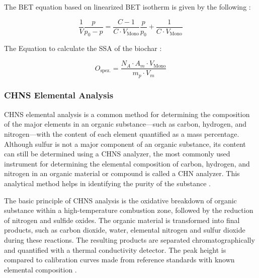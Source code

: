 \vspace{0.3em}

The BET equation based on linearized BET isotherm is given by the following \cite{UniBayreuth2008BET}: 

\begin{equation}
\frac{1}{V}\frac{p}{p_0-p}
=
\frac{C-1}{C \cdot V_{\mathrm{Mono}}}
\frac{p}{p_0}
+
\frac{1}{C \cdot V_{\mathrm{Mono}}}
\label{eq:bet_equation}
\end{equation}

\vspace{0.3em}

The Equation to calculate the SSA of the biochar \cite{UniBayreuth2008BET}: 

\begin{equation}
O_{\mathrm{spez.}}
=
\frac{
N_A \cdot A_m \cdot V_{\mathrm{Mono}}
}{
m_p \cdot V_m
}
\label{eq:specific_surface_area}
\end{equation}

\subsubsection*{CHNS Elemental Analysis}

CHNS elemental analysis is a common method for determining the composition of the major elements in an organic substance—such as carbon, hydrogen, and nitrogen—with the content of each element quantified as a mass percentage. Although sulfur is not a major component of an organic substance, its content can still be determined using a CHNS analyzer, the most commonly used instrument for determining the elemental composition of carbon, hydrogen, and nitrogen in an organic material or compound is called a CHN analyzer. This analytical method helps in identifying the purity of the substance \cite{Fadeeva2008Elemental}. 

\vspace{0.3em}

The basic principle of CHNS analysis is the oxidative breakdown of organic substance within a high-temperature combustion zone, followed by the reduction of nitrogen and sulfide oxides. The organic material is transformed into final products, such as carbon dioxide, water, elemental nitrogen and sulfur dioxide during these reactions. The resulting products are separated chromatographically and quantified with a thermal conductivity detector. The peak height is compared to calibration curves made from reference standards with known elemental composition \cite{Fadeeva2008Elemental}.



